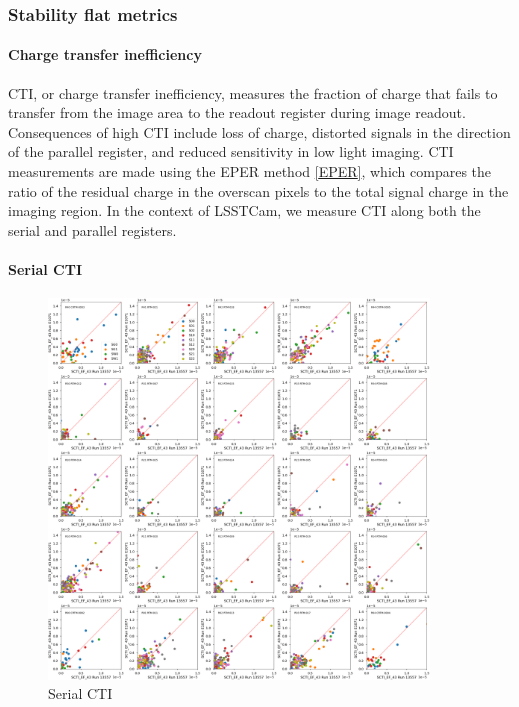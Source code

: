 \subsubsection{Stability flat metrics}\label{stability-flat-metrics}

\paragraph{Charge transfer
inefficiency}\label{charge-transfer-inefficiency}

CTI, or charge transfer inefficiency, measures the fraction of charge
that fails to transfer from the image area to the readout register
during image readout. Consequences of high CTI include loss of charge,
distorted signals in the direction of the parallel register, and reduced
sensitivity in low light imaging. CTI measurements are made using the
EPER method \hyperref[EPER]{{[}EPER{]}}, which compares the ratio of the
residual charge in the overscan pixels to the total signal charge in the
imaging region. In the context of LSSTCam, we measure CTI along both the
serial and parallel registers.

\paragraph{Serial CTI}\label{serial-cti}

\begin{figure}
\begin{centering}
\includegraphics[width=0.9\textwidth]{sections/figures/baselineCharacterization/13557_E1071_SCTI_EF_43.png}
	\caption{Serial CTI \label{fig:serial-cti}}
\end{centering}
\end{figure}

